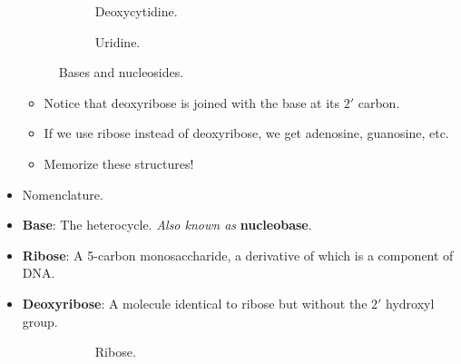 \documentclass[../notes.tex]{subfiles}
\begin{document}
\begin{itemize}
\begin{figure}[h!]
\begin{subfigure}[b]{0.32\linewidth}
            \caption{Deoxycytidine.}
            \label{fig:baseNucleosidei}
        \end{subfigure}
        \begin{subfigure}[b]{0.33\linewidth}
            \centering
            \vspace{1em}
            \caption{Uridine.}
            \label{fig:baseNucleosidej}
        \end{subfigure}
        \caption{Bases and nucleosides.}
        \label{fig:baseNucleoside}
    \end{figure}
    \begin{itemize}
        \item Notice that deoxyribose is joined with the base at its $2'$ carbon.
        \item If we use ribose instead of deoxyribose, we get adenosine, guanosine, etc.
        \item Memorize these structures!
    \end{itemize}
    \item Nomenclature.
    \item \textbf{Base}: The heterocycle. \emph{Also known as} \textbf{nucleobase}.
    \item \textbf{Ribose}: A 5-carbon monosaccharide, a derivative of which is a component of DNA.
    \item \textbf{Deoxyribose}: A molecule identical to ribose but without the $2'$ hydroxyl group.
    \begin{figure}[H]
        \centering
        \footnotesize
        \begin{subfigure}[b]{0.2\linewidth}
            \centering
            \caption{Ribose.}
            \label{fig:dnaSugarsa}
        \end{subfigure}
        \begin{subfigure}[b]{0.2\linewidth}

\end{subfigure}
\end{figure}
\end{itemize}
\end{document}
